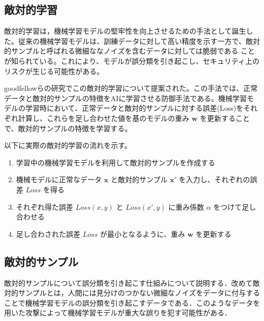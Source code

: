 


\subsection{敵対的学習}
敵対的学習は，機械学習モデルの堅牢性を向上させるための手法として誕生した。従来の機械学習モデルは、訓練データに対して高い精度を示す一方で、敵対的サンプルと呼ばれる微細ななノイズを含むデータに対しては脆弱である
ことが知られている。これにより、モデルが誤分類を引き起こし、セキュリティ上のリスクが生じる可能性がある。

goodfellowらの研究\cite{goodfellow2015explaining}でこの敵対的学習について提案された。この手法では、正常データと敵対的サンプルの特徴をAIに学習させる防御手法である。機械学習モデルの学習時において、正常データと敵対的サンプルに対する誤差(Loss)をそれぞれ計算し、これらを足し合わせた値を基のモデルの重み $\bm{w}$ を更新することで、敵対的サンプルの特徴を学習する。

以下に実際の敵対的学習の流れを示す。
\begin{enumerate}
    \item 学習中の機械学習モデルを利用して敵対的サンプルを作成する

    \item 機械モデルに正常なデータ $\bm{x}$ と敵対的サンプル $\bm{x}'$ を入力し、それぞれの誤差 $Loss$ を得る


    \item それぞれ得た誤差 $Loss(x, y)$ と $Loss(x', y)$ に重み係数 $\alpha$ をつけて足し合わせる
    
    \item 足し合わされた誤差 $Loss$ が最小となるように、重み $\bm{w}$ を更新する
\end{enumerate}

\subsection{敵対的サンプル}
敵対的サンプルについて誤分類を引き起こす仕組みについて説明する．改めて敵対的サンプルとは，人間には見分けのつかない微細なノイズをデータに付与することで機械学習モデルの誤分類を引き起こすデータである．このようなデータを用いた攻撃によって機械学習モデルが重大な誤りを犯す可能性がある．

